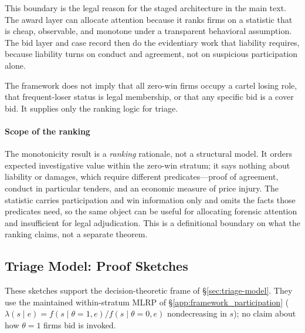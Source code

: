 This boundary is the legal reason for the staged architecture in
the main text. The award layer can allocate attention because it
ranks firms on a statistic that is cheap, observable, and
monotone under a transparent behavioral assumption. The bid layer
and case record then do the evidentiary work that liability
requires, because liability turns on conduct and agreement, not
on suspicious participation alone.

The framework does not imply that all zero-win firms occupy a
cartel losing role, that frequent-loser status is legal
membership, or that any specific bid is a cover bid. It supplies
only the ranking logic for triage.

\paragraph{Scope of the ranking} The monotonicity result is a
\emph{ranking} rationale, not a structural model. It orders
expected investigative value within the zero-win stratum; it says
nothing about liability or damages, which require different
predicates---proof of agreement, conduct in particular tenders,
and an economic measure of price injury. The statistic carries
participation and win information only and omits the facts those
predicates need, so the same object can be useful for allocating
forensic attention and insufficient for legal adjudication. This
is a definitional boundary on what the ranking claims, not a
separate theorem.

\subsection{Triage Model: Proof Sketches}
\label{app:triage-proofs}

These sketches support the decision-theoretic frame of
\S\ref{sec:triage-model}. They use the maintained within-stratum
MLRP of \S\ref{app:framework_participation}
($\lambda(s\mid e)=f(s\mid\theta=1,e)/f(s\mid\theta=0,e)$
nondecreasing in $s$); no claim about how $\theta=1$ firms bid is
invoked.

